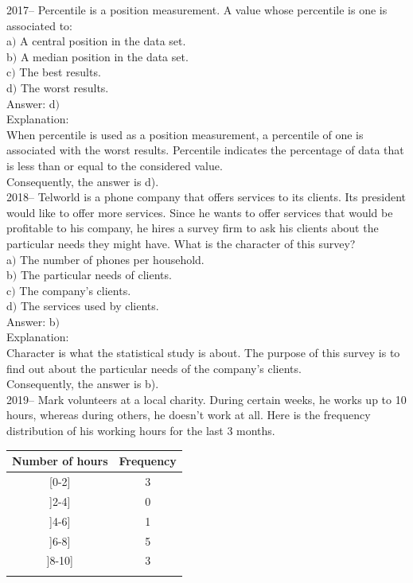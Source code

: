 \documentclass[letterpaper, 12pt]{article}
\begin{document}
2017-- Percentile is a position measurement. A value whose percentile is one is associated to: \\

a$)$ A central position in the data set.\\
b$)$ A median position in the data set.\\
c$)$ The best results.\\
d$)$ The worst results.\\

Answer: d$)$\\

Explanation:\\
When percentile is used as a position measurement, a percentile of one is associated with the worst results. Percentile indicates the percentage of data that is less than or equal to the considered value. \\
Consequently, the answer is d).\\


2018-- Telworld is a phone company that offers services to its clients. Its president would like to offer more services. Since he wants to offer services that would be profitable to his company, he hires a survey firm to ask his clients about the particular needs they might have. What is the character of this survey? \\

a$)$ The number of phones per household.\\
b$)$ The particular needs of clients.\\
c$)$ The company's clients.\\
d$)$ The services used by clients.\\

Answer: b$)$\\

Explanation:\\
Character is what the statistical study is about. The purpose of this survey is to find out about the particular needs of the company's clients.\\
Consequently, the answer is b).\\

2019--  Mark volunteers at a local charity. During certain weeks, he works up to 10 hours, whereas during others, he doesn't work at all. Here is the frequency distribution of his working hours for the last 3 months. \\
\begin{center}
 \begin{tabular}{|c|c|} \hline
{\bf Number of hours} & {\bf Frequency}  \\ \hline \hline

[0-2] & 3 \\ \hline
]2-4] & 0 \\ \hline
]4-6] & 1 \\ \hline
]6-8] & 5 \\ \hline
]8-10] & 3 \\ \hline
\multicolumn{2}{c}{}\\
\end{tabular}\\
\end{center}
\end{document}
